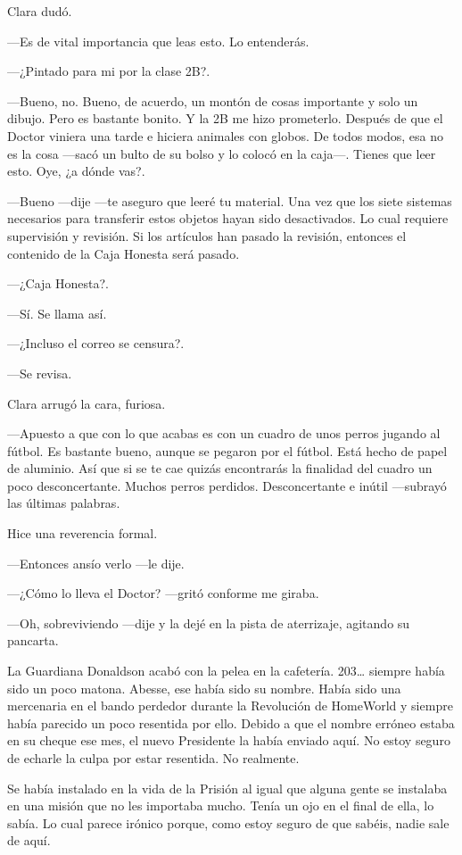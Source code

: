 Clara dudó.

---Es de vital importancia que leas esto. Lo entenderás.

---¿Pintado para mi por la clase 2B?.

---Bueno, no. Bueno, de acuerdo, un montón de cosas importante y solo un
dibujo. Pero es bastante bonito. Y la 2B me hizo prometerlo. Después de
que el Doctor viniera una tarde e hiciera animales con globos. De todos
modos, esa no es la cosa ---sacó un bulto de su bolso y lo colocó en la
caja---. Tienes que leer esto. Oye, ¿a dónde vas?.

---Bueno ---dije ---te aseguro que leeré tu material. Una vez que los
siete sistemas necesarios para transferir estos objetos hayan sido
desactivados. Lo cual requiere supervisión y revisión. Si los artículos
han pasado la revisión, entonces el contenido de la Caja Honesta será
pasado.

---¿Caja Honesta?.

---Sí. Se llama así.

---¿Incluso el correo se censura?.

---Se revisa.

Clara arrugó la cara, furiosa.

---Apuesto a que con lo que acabas es con un cuadro de unos perros
jugando al fútbol. Es bastante bueno, aunque se pegaron por el fútbol.
Está hecho de papel de aluminio. Así que si se te cae quizás encontrarás
la finalidad del cuadro un poco desconcertante. Muchos perros perdidos.
Desconcertante e inútil ---subrayó las últimas palabras.

Hice una reverencia formal.

---Entonces ansío verlo ---le dije.

---¿Cómo lo lleva el Doctor? ---gritó conforme me giraba.

---Oh, sobreviviendo ---dije y la dejé en la pista de aterrizaje,
agitando su pancarta.

La Guardiana Donaldson acabó con la pelea en la cafetería. 203\ldots{}
siempre había sido un poco matona. Abesse, ese había sido su nombre.
Había sido una mercenaria en el bando perdedor durante la Revolución de
HomeWorld y siempre había parecido un poco resentida por ello. Debido a
que el nombre erróneo estaba en su cheque ese mes, el nuevo Presidente
la había enviado aquí. No estoy seguro de echarle la culpa por estar
resentida. No realmente.

Se había instalado en la vida de la Prisión al igual que alguna gente se
instalaba en una misión que no les importaba mucho. Tenía un ojo en el
final de ella, lo sabía. Lo cual parece irónico porque, como estoy
seguro de que sabéis, nadie sale de aquí.

